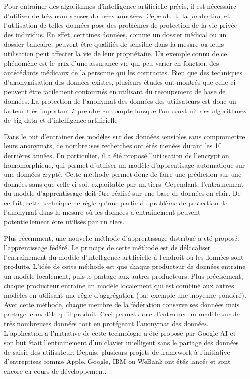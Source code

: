 \documentclass[stage3a]{tnreport} %
\begin{document}
Pour entrainer des algorithmes d'intelligence artificielle précis, il est nécessaire d'utiliser de très nombreuses données annotées. Cependant, la production et l'utilisation de telles données pose des problèmes de protection de la vie privée des individus. En effet, certaines données, comme un dossier médical ou un dossier bancaire, peuvent être qualifiés de sensible dans la mesure ou leurs utilisation peut affecter la vie de leur propriétaire. Un exemple connu de ce phénomène est le prix d'une assurance vie qui peu varier en fonction des antécédants médicaux de la personne qui les contractes. Bien que des techniques d'anonymisation des données existes, plusieurs études ont montrés que celle-ci peuvent être facilement contournés en utilisant du recoupement de base de données. La protection de l'anonymat des données des utilisateurs est donc un facteur très important à prendre en compte lorsque l'on construit des algorithmes de big data et d'intelligence artificielle.

Dans le but d'entrainer des modèles sur des données sensibles sans compromettre leurs anonymats, de nombreuses recherches ont étés menées durant les 10 dernières années. En particulier, il a été proposé  l'utilisation de l'encryption homomorphique, qui permet d'utiliser un modèle d'apprentisage automatique sur une données crypté. Cette méthode permet donc de faire une prédiction sur une données sans que celle-ci soit exploitable par un tiers. Cependant, l'entrainement du modèle d'apprentissage doit être réalisé sur une base de données en clair. De ce fait, cette technique ne rêgle qu'une partie du problème de protection de l'anonymat dans la mesure où les données d'entrainement peuvent potentiellement être utilisés par un tiers.

Plus récemment, une nouvelle méthode d'apprentissage distribué a été proposé: l'apprentissage fédéré. Le principe de cette méthode est de délocaliser l'entrainement du modèle d'intelligence artificielle à l'endroit où les données sont produite. L'idée de cette méthode est que chaque producteur de données entraine un modèle localement, puis le partage aux autres producteurs. Plus précisément, chaque producteur entraine un modèle localement qui est combiné aux autres modèles en utilisant une rêgle d'aggrégation (par exemple une moyenne pondéré). Avec cette méthode, chaque membre de la fédération conserve ses données mais partage le modèle qu'il produit. Ceci permet donc d'entrainer un modèle sur de très nombreuses données tout en protégeant l'anonymat des données. L'application à l'initiative de cette technologie a été proposé par Google AI et son but était l'entrainement d'un clavier intelligent sans le partage des données de saisie des utilisateur. Depuis, plusieurs projets de framework à l'initiative d'entreprises comme Apple, Google, IBM ou WeBank ont étés lancés et sont encore en cours de développement. 
\end{document}
